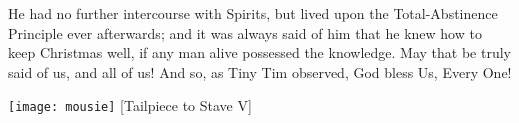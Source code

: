 He had no further intercourse with Spirits, but lived upon the Total-Abstinence Principle ever afterwards; and it was always said of him that he knew how to keep Christmas well, if any man alive possessed the knowledge. May that be truly said of us, and all of us! And so, as Tiny Tim observed, God bless Us, Every One!


\vfill

\begin{center}
	\texttt{[image: mousie]}
	[Tailpiece to Stave V]{}
\end{center}

